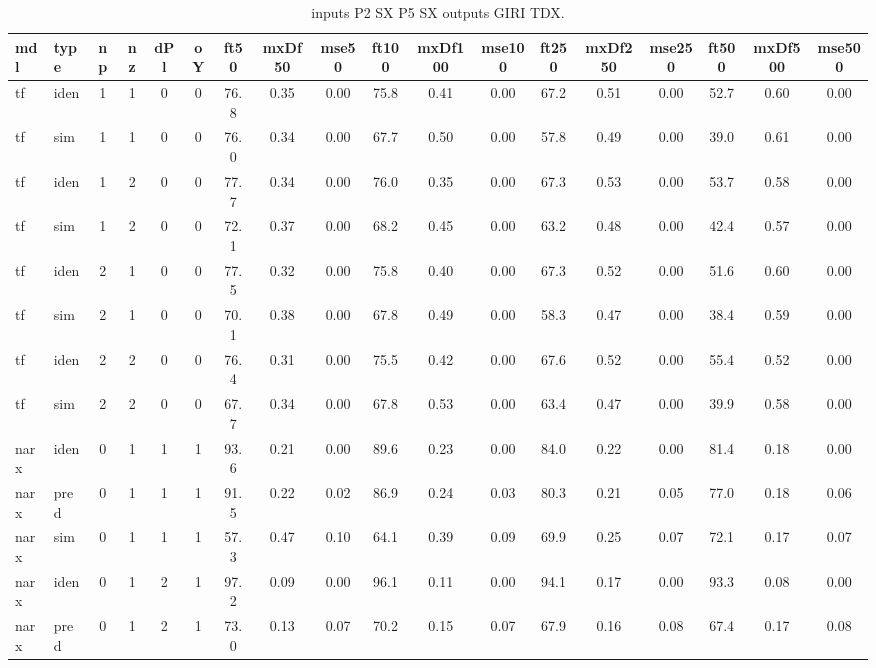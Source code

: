 \begin{landscape} 
 \begin{center} 
\footnotesize
\begin{longtable}{ll|cccc|ccc|ccc|ccc|ccc} 
\caption[inputs P2 SX P5 SX   outputs GIRI TDX]{inputs P2 SX P5 SX   outputs GIRI TDX.} 
\label{tab:inputs_P2_SX_P5_SX___outputs_GIRI_TDX} 
\hline 
  mdl & type & np & nz & dPl & oY & ft50 & mxDf50 & mse50 & ft100 & mxDf100 & mse100 & ft250 & mxDf250 & mse250 & ft500 & mxDf500 & mse500 \\ 
 \hline 
tf  & iden & 1 & 1 & 0 & 0 & 76.8 & 0.35 & 0.00 & 75.8 & 0.41 & 0.00 & 67.2 & 0.51 & 0.00 & 52.7 & 0.60 & 0.00 \\ 
tf  & sim  & 1 & 1 & 0 & 0 & 76.0 & 0.34 & 0.00 & 67.7 & 0.50 & 0.00 & 57.8 & 0.49 & 0.00 & 39.0 & 0.61 & 0.00 \\ 
 \hline 
tf  & iden & 1 & 2 & 0 & 0 & 77.7 & 0.34 & 0.00 & 76.0 & 0.35 & 0.00 & 67.3 & 0.53 & 0.00 & 53.7 & 0.58 & 0.00 \\ 
tf  & sim  & 1 & 2 & 0 & 0 & 72.1 & 0.37 & 0.00 & 68.2 & 0.45 & 0.00 & 63.2 & 0.48 & 0.00 & 42.4 & 0.57 & 0.00 \\ 
 \hline 
tf  & iden & 2 & 1 & 0 & 0 & 77.5 & 0.32 & 0.00 & 75.8 & 0.40 & 0.00 & 67.3 & 0.52 & 0.00 & 51.6 & 0.60 & 0.00 \\ 
tf  & sim  & 2 & 1 & 0 & 0 & 70.1 & 0.38 & 0.00 & 67.8 & 0.49 & 0.00 & 58.3 & 0.47 & 0.00 & 38.4 & 0.59 & 0.00 \\ 
 \hline 
tf  & iden & 2 & 2 & 0 & 0 & 76.4 & 0.31 & 0.00 & 75.5 & 0.42 & 0.00 & 67.6 & 0.52 & 0.00 & 55.4 & 0.52 & 0.00 \\ 
tf  & sim  & 2 & 2 & 0 & 0 & 67.7 & 0.34 & 0.00 & 67.8 & 0.53 & 0.00 & 63.4 & 0.47 & 0.00 & 39.9 & 0.58 & 0.00 \\ 
 \hline 
narx & iden & 0 & 1 & 1 & 1 & 93.6 & 0.21 & 0.00 & 89.6 & 0.23 & 0.00 & 84.0 & 0.22 & 0.00 & 81.4 & 0.18 & 0.00 \\ 
narx & pred & 0 & 1 & 1 & 1 & 91.5 & 0.22 & 0.02 & 86.9 & 0.24 & 0.03 & 80.3 & 0.21 & 0.05 & 77.0 & 0.18 & 0.06 \\ 
narx & sim  & 0 & 1 & 1 & 1 & 57.3 & 0.47 & 0.10 & 64.1 & 0.39 & 0.09 & 69.9 & 0.25 & 0.07 & 72.1 & 0.17 & 0.07 \\ 
 \hline 
narx & iden & 0 & 1 & 2 & 1 & 97.2 & 0.09 & 0.00 & 96.1 & 0.11 & 0.00 & 94.1 & 0.17 & 0.00 & 93.3 & 0.08 & 0.00 \\ 
narx & pred & 0 & 1 & 2 & 1 & 73.0 & 0.13 & 0.07 & 70.2 & 0.15 & 0.07 & 67.9 & 0.16 & 0.08 & 67.4 & 0.17 & 0.08 \\ 

\end{longtable}
\end{center}
\end{landscape}
